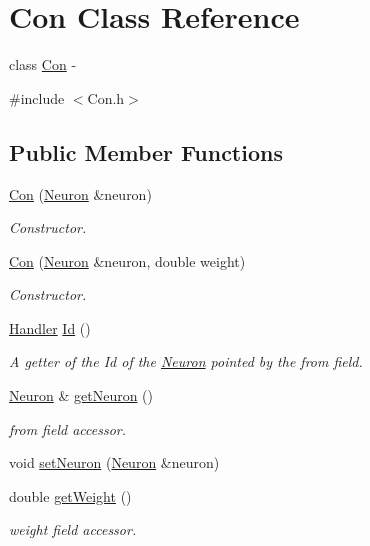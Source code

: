 \hypertarget{class_con}{
\section{Con Class Reference}
\label{class_con}
}


class \hyperlink{class_con}{Con} -\/  




{\ttfamily \#include $<$Con.h$>$}

\subsection*{Public Member Functions}
\begin{DoxyCompactItemize}
\item 
\hyperlink{class_con_a7fab3ece0e894f44f31d10a21b1d49c7}{Con} (\hyperlink{class_neuron}{Neuron} \&neuron)
\begin{DoxyCompactList}\small\item\em Constructor. \end{DoxyCompactList}\item 
\hyperlink{class_con_ad0b1e0d1eefd2296b23a2cfea04fc559}{Con} (\hyperlink{class_neuron}{Neuron} \&neuron, double weight)
\begin{DoxyCompactList}\small\item\em Constructor. \end{DoxyCompactList}\item 
\hyperlink{_a_m_o_r_e_8h_abc871abb71cff6655b8172ee7240b8ef}{Handler} \hyperlink{class_con_aee0a0b6c5beff6e227f9ebf33af2d209}{Id} ()
\begin{DoxyCompactList}\small\item\em A getter of the Id of the \hyperlink{class_neuron}{Neuron} pointed by the from field. \end{DoxyCompactList}\item 
\hyperlink{class_neuron}{Neuron} \& \hyperlink{class_con_a2209567efd330a58825b5068a421afe1}{getNeuron} ()
\begin{DoxyCompactList}\small\item\em from field accessor. \end{DoxyCompactList}\item 
void \hyperlink{class_con_ae372f50a253a424376959fb6ee8f083b}{setNeuron} (\hyperlink{class_neuron}{Neuron} \&neuron)
\item 
double \hyperlink{class_con_a385c5bf6eb9e2ffc94c5b427c287ccb2}{getWeight} ()
\begin{DoxyCompactList}\small\item\em weight field accessor. \end{DoxyCompactList}\item 

\end{DoxyCompactItemize}
